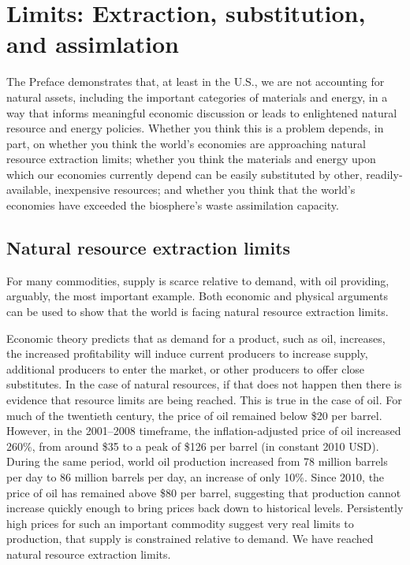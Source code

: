 \section{Limits: Extraction, substitution, and assimlation}
\label{sec:limits}

The Preface demonstrates that, at least in the U.S., 
we are not accounting for natural assets, 
including the important categories of materials and energy,
in a way that informs meaningful economic discussion or
leads to enlightened natural resource and energy policies.
Whether you think this is a problem depends, in part, on 
whether you think the world's economies are approaching 
	natural resource extraction limits;
whether you think the materials and energy upon which our economies currently depend
	can be easily substituted by other, readily-available, inexpensive resources; and
whether you think that the world's economies have exceeded 
	the biosphere's waste assimilation capacity.


\subsection{Natural resource extraction limits}
\label{sub:natural_resource_extraction_limits}

For many commodities, supply is scarce relative to demand, 
with oil providing, arguably, the most important example. 
Both economic and physical arguments can be used to show that the world is facing
natural resource extraction limits.

Economic theory predicts that as demand for a product, such as oil, increases,
the increased profitability will induce current producers to increase supply, 
additional producers to enter the market,
or other producers to offer close substitutes. 
In the case of natural resources, if that does not happen
then there is evidence that resource limits are being reached.
This is true in the case of oil.
For much of the twentieth century, the price of oil remained below \$20 per barrel.
However, in the 2001--2008 timeframe,
the inflation-adjusted price of oil increased 260\%,
from around \$35 to a peak of \$126 per barrel 
(in constant 2010 USD).
During the same period,
world oil production increased from 
78 million barrels per day to 86 million barrels per day,
an increase of only 10\%.\cite{EIA2014}
Since 2010, the price of oil has remained above \$80 per barrel,
suggesting that production cannot increase quickly enough to bring prices
back down to historical levels.
Persistently high prices for such an important commodity
suggest very real limits to production, 
that supply is constrained relative to demand. 
We have reached natural resource extraction limits.


